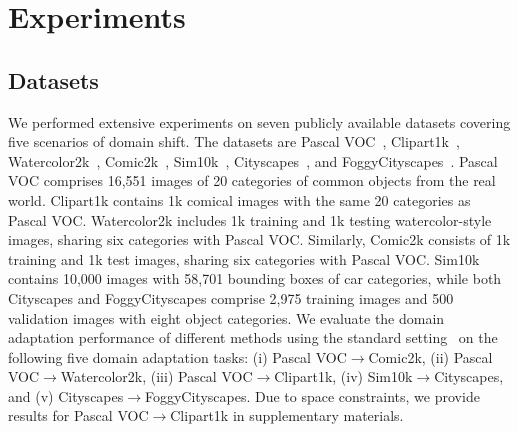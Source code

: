 \documentclass{bmvc2k}
\begin{document}
\section{Experiments}
\subsection{Datasets}
We performed extensive experiments on seven publicly available datasets covering five scenarios of domain shift. The datasets are Pascal VOC~\cite{everingham2010Pascal}, Clipart1k~\cite{inoue2018cross}, 
Watercolor2k~\cite{inoue2018cross}, 
Comic2k~\cite{inoue2018cross}, 
Sim10k~\cite{johnson2016driving}, Cityscapes~\cite{cordts2016cityscapes}, and FoggyCityscapes~\cite{sakaridis2018semantic}. Pascal VOC comprises 16,551 images of 20 categories of common objects from the real world. Clipart1k contains 1k comical images with the same 20 categories as Pascal VOC. Watercolor2k includes 1k training and 1k testing watercolor-style images, sharing six categories with Pascal VOC. Similarly, Comic2k consists of 1k training and 1k test images, sharing six categories with Pascal VOC. Sim10k contains 10,000 images with 58,701 bounding boxes of car categories, while both Cityscapes and FoggyCityscapes comprise 2,975 training images and 500 validation images with eight object categories. We evaluate the domain adaptation performance of different methods using the standard setting~\cite{saito2019strong, li2022cross} on the following five domain adaptation tasks: (i) Pascal VOC$\xrightarrow{}$Comic2k, (ii) Pascal VOC$\xrightarrow{}$Watercolor2k, (iii) Pascal VOC$\xrightarrow{}$Clipart1k, (iv) Sim10k$\xrightarrow{}$Cityscapes, and (v) Cityscapes$\xrightarrow{}$FoggyCityscapes.
Due to space constraints, we provide results for Pascal VOC$\xrightarrow{}$Clipart1k in supplementary materials.
\end{document}
